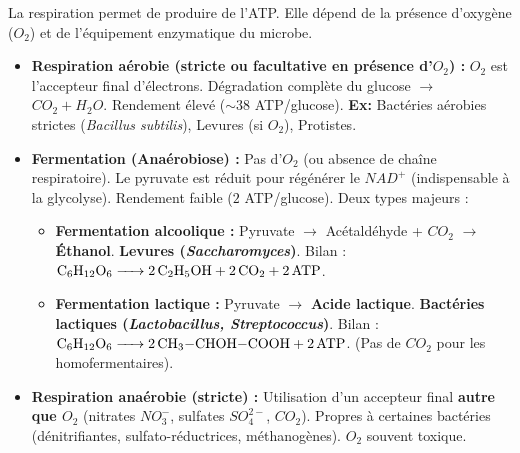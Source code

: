 \documentclass[11pt]{article}
\begin{document}
\begin{definition}
    La respiration permet de produire de l'ATP. Elle dépend de la présence d'oxygène ($O_2$) et de l'équipement enzymatique du microbe.
    \begin{itemize}
        \item \textbf{Respiration aérobie (stricte ou facultative en présence d'$O_2$) :} $O_2$ est l'accepteur final d'électrons. Dégradation complète du glucose $\rightarrow$ $CO_2 + H_2O$. Rendement élevé ($\sim 38$ ATP/glucose). \textbf{Ex:} Bactéries aérobies strictes (\emph{Bacillus subtilis}), Levures (si $O_2$), Protistes.
        \item \textbf{Fermentation (Anaérobiose) :} Pas d'$O_2$ (ou absence de chaîne respiratoire). Le pyruvate est réduit pour régénérer le $NAD^+$ (indispensable à la glycolyse). Rendement faible ($2$ ATP/glucose). Deux types majeurs :
              \begin{itemize}
                  \item \textbf{Fermentation alcoolique :} Pyruvate $\rightarrow$ Acétaldéhyde + $CO_2$ $\rightarrow$ \textbf{Éthanol}. \textbf{Levures (\emph{Saccharomyces})}. Bilan : $\ce{C6H12O6 -> 2 C2H5OH + 2 CO2 + 2 ATP}$.
                  \item \textbf{Fermentation lactique :} Pyruvate $\rightarrow$ \textbf{Acide lactique}. \textbf{Bactéries lactiques (\emph{Lactobacillus, Streptococcus})}. Bilan : $\ce{C6H12O6 -> 2 CH3-CHOH-COOH + 2 ATP}$. (Pas de $CO_2$ pour les homofermentaires).
              \end{itemize}
        \item \textbf{Respiration anaérobie (stricte) :} Utilisation d'un accepteur final \textbf{autre que $O_2$} (nitrates $NO_3^-$, sulfates $SO_4^{2-}$, $CO_2$). Propres à certaines bactéries (dénitrifiantes, sulfato-réductrices, méthanogènes). $O_2$ souvent toxique.
    \end{itemize}
\end{definition}
\end{document}
